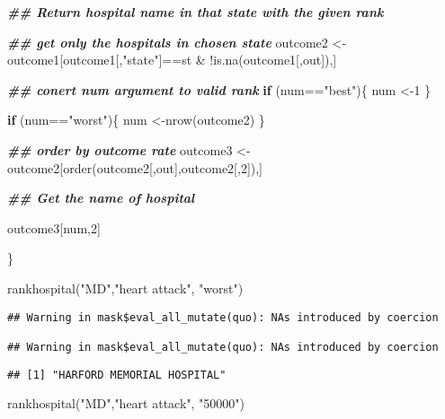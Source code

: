 \documentclass[
]{article}
\newenvironment{Shaded}{\begin{snugshade}}{\end{snugshade}}
\newcommand{\ControlFlowTok}[1]{\textcolor[rgb]{0.13,0.29,0.53}{\textbf{#1}}}
\newcommand{\DecValTok}[1]{\textcolor[rgb]{0.00,0.00,0.81}{#1}}
\newcommand{\DocumentationTok}[1]{\textcolor[rgb]{0.56,0.35,0.01}{\textbf{\textit{#1}}}}
\newcommand{\FunctionTok}[1]{\textcolor[rgb]{0.00,0.00,0.00}{#1}}
\newcommand{\NormalTok}[1]{#1}
\newcommand{\OtherTok}[1]{\textcolor[rgb]{0.56,0.35,0.01}{#1}}
\newcommand{\SpecialCharTok}[1]{\textcolor[rgb]{0.00,0.00,0.00}{#1}}
\newcommand{\StringTok}[1]{\textcolor[rgb]{0.31,0.60,0.02}{#1}}
\begin{document}
\begin{Shaded}
\begin{Highlighting}[]
  \DocumentationTok{\#\# Return hospital name in that state with the given rank}

          \DocumentationTok{\#\# get only the hospitals in chosen state}
\NormalTok{          outcome2 }\OtherTok{\textless{}{-}}\NormalTok{ outcome1[outcome1[,}\StringTok{"state"}\NormalTok{]}\SpecialCharTok{==}\NormalTok{st }\SpecialCharTok{\&} \SpecialCharTok{!}\FunctionTok{is.na}\NormalTok{(outcome1[,out]),]}

          \DocumentationTok{\#\# conert num argument to valid rank}
          \ControlFlowTok{if}\NormalTok{ (num}\SpecialCharTok{==}\StringTok{"best"}\NormalTok{)\{}
\NormalTok{            num }\OtherTok{\textless{}{-}}\DecValTok{1}
\NormalTok{          \}}

          \ControlFlowTok{if}\NormalTok{ (num}\SpecialCharTok{==}\StringTok{"worst"}\NormalTok{)\{}
\NormalTok{            num }\OtherTok{\textless{}{-}}\FunctionTok{nrow}\NormalTok{(outcome2)}
\NormalTok{          \}}

          \DocumentationTok{\#\# order by outcome rate}
\NormalTok{          outcome3 }\OtherTok{\textless{}{-}}\NormalTok{ outcome2[}\FunctionTok{order}\NormalTok{(outcome2[,out],outcome2[,}\DecValTok{2}\NormalTok{]),]}

          \DocumentationTok{\#\# Get the name of hospital}

\NormalTok{          outcome3[num,}\DecValTok{2}\NormalTok{]}

\NormalTok{\}}


\FunctionTok{rankhospital}\NormalTok{(}\StringTok{"MD"}\NormalTok{,}\StringTok{"heart attack"}\NormalTok{, }\StringTok{"worst"}\NormalTok{)}
\end{Highlighting}
\end{Shaded}

\begin{verbatim}
## Warning in mask$eval_all_mutate(quo): NAs introduced by coercion

## Warning in mask$eval_all_mutate(quo): NAs introduced by coercion
\end{verbatim}

\begin{verbatim}
## [1] "HARFORD MEMORIAL HOSPITAL"
\end{verbatim}

\begin{Shaded}
\begin{Highlighting}[]
\FunctionTok{rankhospital}\NormalTok{(}\StringTok{"MD"}\NormalTok{,}\StringTok{"heart attack"}\NormalTok{, }\StringTok{"50000"}\NormalTok{)}
\end{Highlighting}
\end{Shaded}
\end{document}
